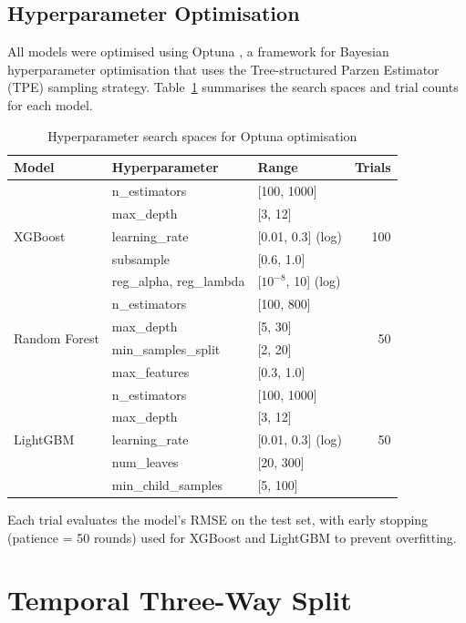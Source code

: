 \documentclass[12pt,a4paper,oneside]{report}
\begin{document}
\subsection{Hyperparameter Optimisation}

All models were optimised using Optuna \citep{akiba2019optuna}, a framework for Bayesian hyperparameter optimisation that uses the Tree-structured Parzen Estimator (TPE) sampling strategy. Table~\ref{tab:hyperparams} summarises the search spaces and trial counts for each model.

\begin{table}[htbp]
\centering
\caption{Hyperparameter search spaces for Optuna optimisation}
\label{tab:hyperparams}
\small
\begin{tabular}{lllr}
\toprule
\textbf{Model} & \textbf{Hyperparameter} & \textbf{Range} & \textbf{Trials} \\
\midrule
\multirow{5}{*}{XGBoost} & n\_estimators & [100, 1000] & \multirow{5}{*}{100} \\
 & max\_depth & [3, 12] & \\
 & learning\_rate & [0.01, 0.3] (log) & \\
 & subsample & [0.6, 1.0] & \\
 & reg\_alpha, reg\_lambda & [$10^{-8}$, 10] (log) & \\
\midrule
\multirow{4}{*}{Random Forest} & n\_estimators & [100, 800] & \multirow{4}{*}{50} \\
 & max\_depth & [5, 30] & \\
 & min\_samples\_split & [2, 20] & \\
 & max\_features & [0.3, 1.0] & \\
\midrule
\multirow{5}{*}{LightGBM} & n\_estimators & [100, 1000] & \multirow{5}{*}{50} \\
 & max\_depth & [3, 12] & \\
 & learning\_rate & [0.01, 0.3] (log) & \\
 & num\_leaves & [20, 300] & \\
 & min\_child\_samples & [5, 100] & \\
\bottomrule
\end{tabular}
\end{table}

Each trial evaluates the model's RMSE on the test set, with early stopping (patience = 50 rounds) used for XGBoost and LightGBM to prevent overfitting.

\section{Temporal Three-Way Split}
\label{sec:split}
\end{document}
